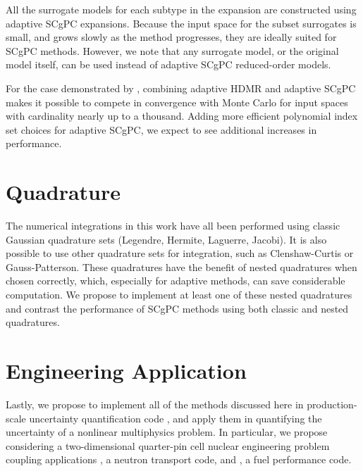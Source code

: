 All the surrogate models for each subtype in the expansion are constructed using adaptive SCgPC expansions.
Because the input space for the subset surrogates is small, and grows slowly as the method progresses, they
are ideally suited for SCgPC methods.  However, we note that any surrogate model, or the original model
itself, can be used instead of adaptive SCgPC reduced-order models.

For the case demonstrated by \cite{Ayres}, combining adaptive HDMR and adaptive SCgPC makes it possible to
compete in convergence with Monte Carlo for input spaces with cardinality nearly up to a thousand.  Adding
more efficient polynomial index set choices for adaptive SCgPC, we expect to see additional increases in 
performance.

\section{Quadrature}
The numerical integrations in this work have all been performed using classic Gaussian quadrature sets
(Legendre, Hermite, Laguerre, Jacobi).  It is also possible to use other quadrature sets for integration, such
as Clenshaw-Curtis or Gauss-Patterson.  These quadratures have the benefit of nested quadratures when chosen
correctly, which, especially for adaptive methods, can save considerable computation.  We propose to implement
at least one of these nested quadratures and contrast the performance of SCgPC methods using both classic and
nested quadratures.

\section{Engineering Application}
Lastly, we propose to implement all of the methods discussed here in production-scale uncertainty
quantification code \raven{}, and apply them in quantifying the uncertainty of a nonlinear multiphysics
problem.  In particular, we propose considering a two-dimensional quarter-pin cell nuclear engineering problem
coupling \moose{} applications \rattlesnake{}, a neutron transport code, and \bison{}, a fuel performance
code.
